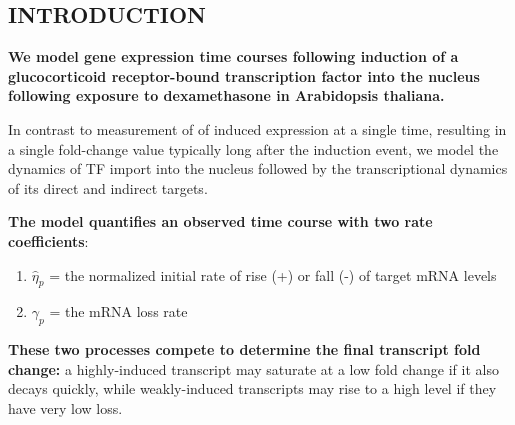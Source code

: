 \documentclass[aspb,landscape]{a0poster}
\begin{document}
\begin{multicols}{4} %

  \color{Black} %




  {
    \titlespacing{\section}{0pt}{0pt}{0pt} %
    \section*{INTRODUCTION}
  }

  \textbf{We model gene expression time courses following induction of a glucocorticoid receptor-bound transcription factor into the nucleus following exposure to dexamethasone in Arabidopsis thaliana.}
  
  In contrast to measurement of of induced expression at a single time, resulting in a single fold-change value typically long after the induction event,
  we model the dynamics of TF import into the nucleus followed by the transcriptional dynamics of its direct and indirect targets.
  
  \textbf{The model quantifies an observed time course with two rate coefficients}:
  \begin{enumerate}
  \item $\hat{\eta}_p$ = the normalized initial rate of rise (+) or fall (-) of target mRNA levels
  \item $\gamma_p$ = the mRNA loss rate
  \end{enumerate}
  \textbf{These two processes compete to determine the final transcript fold change:} a highly-induced transcript may saturate at a low fold change if it also decays quickly,
  while weakly-induced transcripts may rise to a high level if they have very low loss.
  

\end{multicols}
\end{document}
